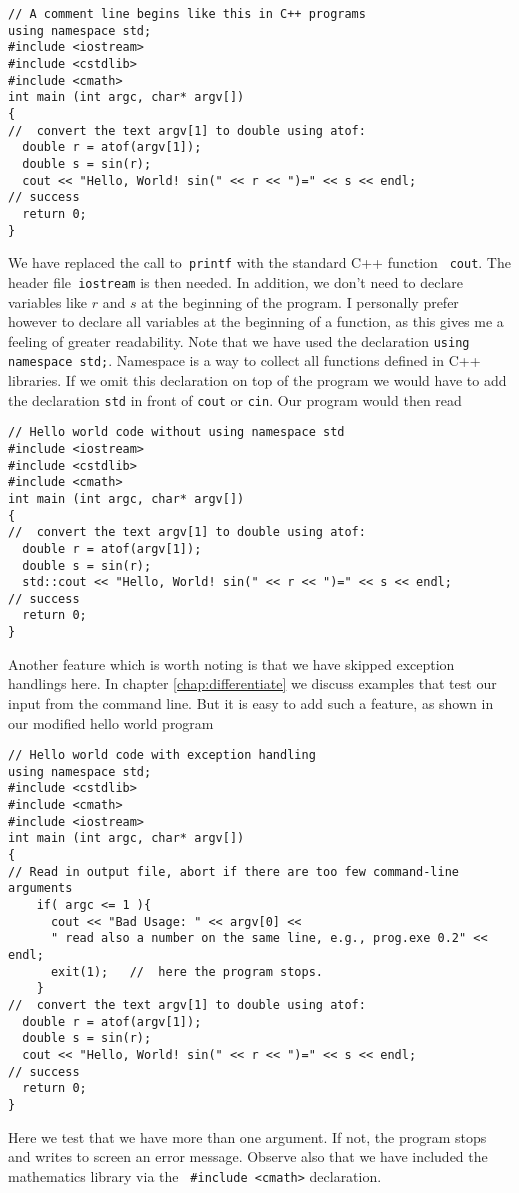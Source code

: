\begin{lstlisting}
// A comment line begins like this in C++ programs
using namespace std;
#include <iostream>
#include <cstdlib>
#include <cmath>
int main (int argc, char* argv[])
{
//  convert the text argv[1] to double using atof: 
  double r = atof(argv[1]); 
  double s = sin(r);
  cout << "Hello, World! sin(" << r << ")=" << s << endl;
// success 
  return 0;  
}
\end{lstlisting}
We have replaced the call to\verb? printf? with the standard C++ function
\verb? cout?. The header file\verb? iostream? is then needed.
In addition, we don't need to 
declare variables like $r$ and $s$  at the beginning of the program. 
I personally prefer
however to declare all variables at the beginning of a function, as this
gives me a feeling of greater readability.
Note that we have used the declaration \verb?using namespace std;?. Namespace is a 
way to collect 
all functions defined in C++ libraries. If we omit this declaration on top of the program
we would have to add the declaration \verb?std? in front of  
\verb?cout? or \verb?cin?.  Our program would then read
\begin{lstlisting}
// Hello world code without using namespace std
#include <iostream>
#include <cstdlib>
#include <cmath>
int main (int argc, char* argv[])
{
//  convert the text argv[1] to double using atof: 
  double r = atof(argv[1]); 
  double s = sin(r);
  std::cout << "Hello, World! sin(" << r << ")=" << s << endl;
// success 
  return 0;  
}
\end{lstlisting}

Another feature which is worth noting is that we have skipped exception handlings here.
In chapter \ref{chap:differentiate} we discuss examples that test our input from the command
line.  But it is easy to add such a feature, as shown in our modified hello world program
\begin{lstlisting}
// Hello world code with exception handling
using namespace std;
#include <cstdlib>
#include <cmath>
#include <iostream>
int main (int argc, char* argv[])
{
// Read in output file, abort if there are too few command-line arguments
    if( argc <= 1 ){
      cout << "Bad Usage: " << argv[0] <<
      " read also a number on the same line, e.g., prog.exe 0.2" << endl;
      exit(1);   //  here the program stops.
    }
//  convert the text argv[1] to double using atof: 
  double r = atof(argv[1]); 
  double s = sin(r);
  cout << "Hello, World! sin(" << r << ")=" << s << endl;
// success 
  return 0;  
}
\end{lstlisting}
Here we test that we have more than one argument. If not, the program stops and writes to screen
an error message. Observe also that we have included the mathematics library via the 
\verb? #include <cmath>?  declaration.



